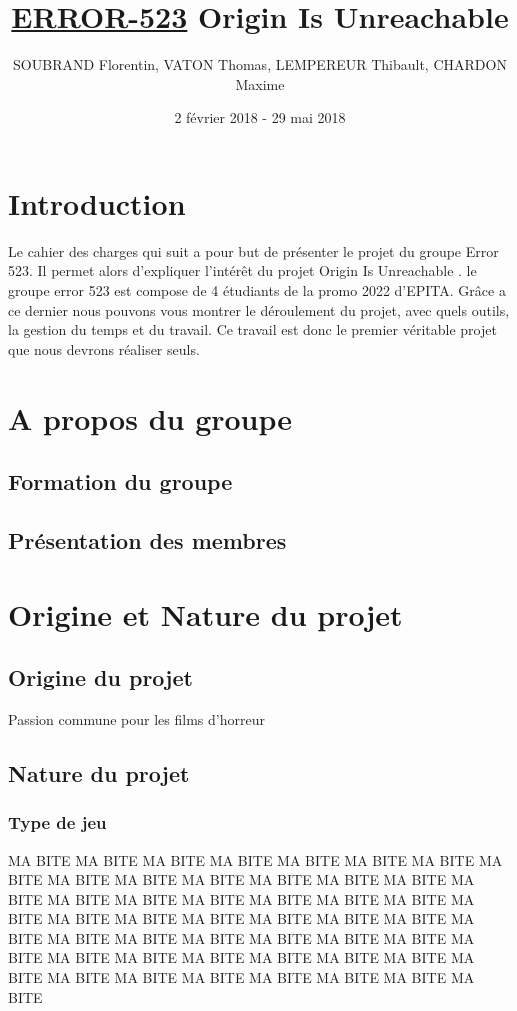 \documentclass[12pt,a4paper]{article}
\title{\textbf { \huge{\underline{ERROR-523}} \bigbreak  \large{Origin Is Unreachable}}}
\author{SOUBRAND Florentin, VATON Thomas, LEMPEREUR Thibault, CHARDON Maxime}
\date {2 février 2018 - 29 mai 2018}
\begin{document}
\pagestyle{fancy}




\newpage
\thispagestyle{empty}
\tableofcontents

\newpage

\section{Introduction}
Le cahier des charges qui suit a pour but de présenter le projet du groupe Error 523. Il permet alors d'expliquer l'intérêt du projet Origin Is Unreachable . le groupe error 523 est compose de 4 étudiants de la promo 2022 d'EPITA. Grâce a ce dernier nous pouvons vous montrer le déroulement du projet, avec quels outils, la gestion du temps et du travail. Ce travail est donc le premier véritable projet que nous devrons réaliser seuls.

\newpage
\section {A propos du groupe}
\subsection{Formation du groupe}

\subsection{Présentation des membres}


\newpage
\section{Origine et Nature du projet}
\subsection{Origine du projet}
Passion commune pour les films d'horreur
\subsection{Nature du projet}
\subsubsection{Type de jeu}
MA BITE MA BITE MA BITE MA BITE MA BITE MA BITE MA BITE MA BITE MA BITE MA BITE 
MA BITE MA BITE MA BITE MA BITE MA BITE MA BITE MA BITE MA BITE MA BITE MA BITE 
MA BITE MA BITE MA BITE MA BITE MA BITE MA BITE MA BITE MA BITE MA BITE MA BITE 
MA BITE MA BITE MA BITE MA BITE MA BITE MA BITE MA BITE MA BITE MA BITE MA BITE 
MA BITE MA BITE MA BITE MA BITE MA BITE MA BITE MA BITE MA BITE MA BITE MA BITE 
\end{document}
